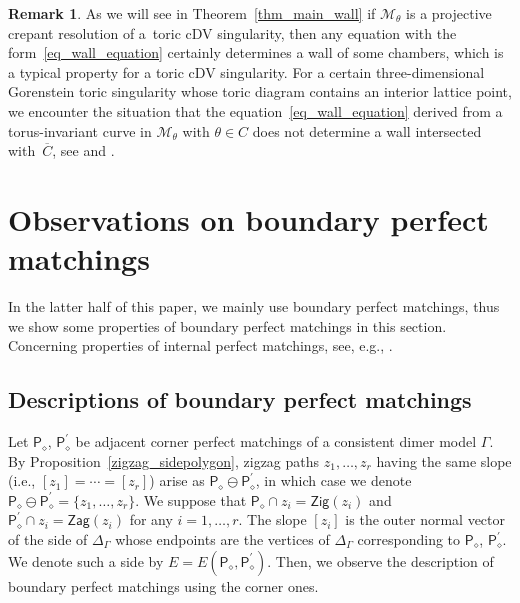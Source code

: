 \documentclass[pdftex]{sigma}
\numberwithin{equation}{section}
\theoremstyle{definition}
\newtheorem{Remark}[Theorem]{Remark}
\newcommand{\calM}{\mathcal{M}}
\newcommand{\sfP}{\mathsf{P}}
\newcommand{\Zig}{\mathsf{Zig}}
\newcommand{\Zag}{\mathsf{Zag}}
\newcommand{\cPM}{\sfP_\diamond}
\begin{document}
\begin{Remark}
As we will see in Theorem~\ref{thm_main_wall} if $\calM_\theta$ is a projective crepant resolution of a~toric cDV singularity,
then any equation with the form~\eqref{eq_wall_equation} certainly
determines a wall of some chambers, which is a typical property for a toric cDV singularity.
For a certain three-dimensional Gorenstein toric singularity whose toric diagram contains an interior lattice point,
we encounter the situation that the equation~\eqref{eq_wall_equation} derived from a torus-invariant curve in $\calM_\theta$ with $\theta\in C$
does not determine a wall intersected with~$\overline{C}$, see \cite[Example~9.13]{CrawIshii} and \cite[Example~12.6]{IU_anycrepant}.
\end{Remark}

\section{Observations on boundary perfect matchings}\label{section_boundaryPM}

In the latter half of this paper, we mainly use boundary perfect matchings, thus we show some properties of boundary perfect matchings in this section.
Concerning properties of internal perfect matchings, see, e.g., \cite[Sections~3 and 5]{Nak_2rep}.

\subsection{Descriptions of boundary perfect matchings}\label{subsec_boundaryPM}

Let $\cPM$, $\cPM^\prime$ be adjacent corner perfect matchings of a consistent dimer model $\Gamma$.
By Proposition~\ref{zigzag_sidepolygon}, zigzag paths $z_1,\dots, z_r$ having the same slope (i.e., $[z_1]=\cdots=[z_r]$)
arise as $\cPM\ominus\cPM^\prime$, in which case we denote $\cPM\ominus\cPM^\prime=\{z_1,\dots, z_r\}$.
We suppose that $\cPM\cap z_i=\Zig(z_i)$ and $\cPM^\prime\cap z_i=\Zag(z_i)$ for any $i=1,\dots,r$.
The slope $[z_i]$ is the outer normal vector of the side of $\Delta_\Gamma$ whose endpoints are the vertices of $\Delta_\Gamma$
corresponding to $\cPM$, $\cPM^\prime$. We denote such a side by $E=E(\cPM, \cPM^\prime)$.
Then, we observe the description of boundary perfect matchings using the corner ones.
\end{document}
